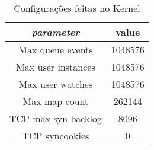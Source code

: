 \begin{table}
  \centering
  \begin{tabular}{|c|c|} \hline
  \textit{parameter} & \textbf{value}\\
    \hline\hline
   Max queue events & 1048576\\
     \hline
   Max user instances & 1048576\\
    \hline
   Max user watches & 1048576\\
    \hline
   Max map count & 262144\\
    \hline
   TCP max syn backlog & 8096\\
    \hline TCP syncookies & 0\\
    \hline
  \end{tabular}

  \caption{Configurações feitas no Kernel}
  \label{tab:kernel_config}
\end{table}

